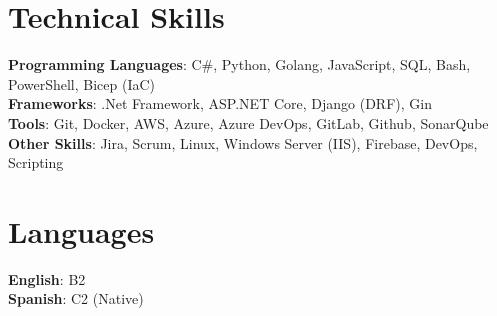 \section{Technical Skills}
 \begin{itemize}[leftmargin=0.15in, label={}]
    \small{\item{
     \textbf{Programming Languages}{: C\#, Python, Golang, JavaScript, SQL, Bash, PowerShell, Bicep (IaC)} \\
     \textbf{Frameworks}{: .Net Framework, ASP.NET Core, Django (DRF), Gin} \\
     \textbf{Tools}{: Git, Docker, AWS, Azure, Azure DevOps, GitLab, Github, SonarQube} \\
     \textbf{Other Skills}{: Jira, Scrum, Linux, Windows Server (IIS), Firebase, DevOps, Scripting}
    }}
 \end{itemize}

\section{Languages}
 \begin{itemize}[leftmargin=0.15in, label={}]
    \small{\item{
     \textbf{English}{: B2} \\
     \textbf{Spanish}{: C2 (Native)} \\
    }}
 \end{itemize}
